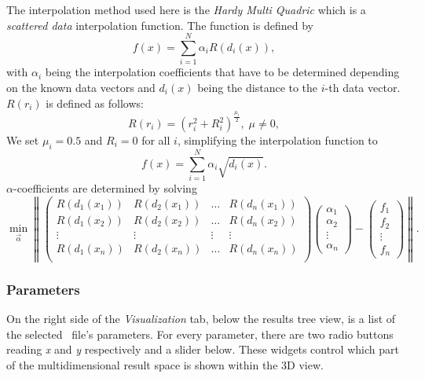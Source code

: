 The interpolation method used here is the \textit{Hardy Multi Quadric} which is a \textit{scattered data} interpolation function.
The function is defined by
\textbf{\begin{equation}
	f(x)= \sum_{i=1}^{N} \alpha_{i} R(d_{i}(x)),
\end{equation}}
with $\alpha_{i}$ being the interpolation coefficients that have to be determined
depending on the known data vectors and
$d_i(x)$ being the distance to the $i$-th data vector.
$R(r_i)$ is defined as follows:
\begin{equation}
	R(r_{i}) = (r_{i}^{2} + R_{i}^{2})^{\frac{\mu_{i}}{2}},
	\;
	\mu \neq 0,
\end{equation}
We set $\mu_i = 0.5$ and $R_{i}=0$ for all $i$, simplifying the interpolation function to
\textbf{\begin{equation}
	f(x)= \sum_{i=1}^{N} \alpha_{i} \sqrt{d_{i}(x)}.
\end{equation}}
$\alpha$-coefficients are determined by solving
\begin{equation}
	\min_{\vec{\alpha}} \left\|
	\left( 
	\begin {array} {cccc}
	R(d_{1}(x_{1})) & R(d_{2}(x_{1})) & \dots & R(d_{n}(x_{1})) \\
	R(d_{1}(x_{2})) & R(d_{2}(x_{2})) & \dots & R(d_{n}(x_{2})) \\
	\vdots & \vdots & \vdots & \vdots \\
	R(d_{1}(x_{n})) & R(d_{2}(x_{n})) & \dots & R(d_{n}(x_{n})) \\
	\end {array}
	\right)
	\left( 
	\begin {array} {c}
	\alpha_{1} \\
	\alpha_{2} \\
	\vdots \\
	\alpha_{n}
	\end {array}
	\right)
	-
	\left( 
	\begin {array} {c}
	f_{1} \\
	f_{2} \\
	\vdots \\
	f_{n}
	\end {array}
	\right)
	\right\|.
\end{equation}



\subsubsection{Parameters}
\label{pqueue:vis:parameter}
On the right side of the \textit{Visualization} tab, below the results tree view,
is a list of the selected \PJOB\ file's parameters.
For every parameter, there are two radio buttons reading \textit{x} and \textit{y} respectively
and a slider below.
These widgets control which part of the multidimensional result space is shown within the 3D view.

